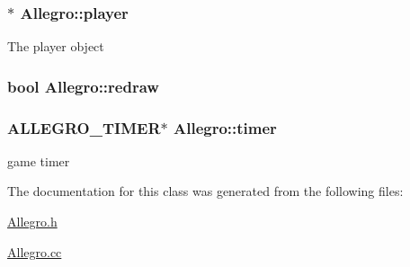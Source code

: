 \label{classAllegro_ae15c8aa4996c4a2063f5678630eb9e65}
\hypertarget{classAllegro_a888f6af0c64c1c1eac49fc54d283e035}{
\subsubsection[{player}]{$\ast$ {\bf Allegro::player}}}
\label{classAllegro_a888f6af0c64c1c1eac49fc54d283e035}
The player object \hypertarget{classAllegro_a09c325f5ec95db410ce99ea5c4312b4b}{
\subsubsection[{redraw}]{\setlength{\rightskip}{0pt plus 5cm}bool {\bf Allegro::redraw}}}
\label{classAllegro_a09c325f5ec95db410ce99ea5c4312b4b}
\hypertarget{classAllegro_a34a3f6946a82531b3cd7855bf96dfec5}{
\subsubsection[{timer}]{\setlength{\rightskip}{0pt plus 5cm}ALLEGRO\_\-TIMER$\ast$ {\bf Allegro::timer}}}
\label{classAllegro_a34a3f6946a82531b3cd7855bf96dfec5}
game timer 

The documentation for this class was generated from the following files:\begin{DoxyCompactItemize}
\item 
\hyperlink{Allegro_8h}{Allegro.h}\item 
\hyperlink{Allegro_8cc}{Allegro.cc}\end{DoxyCompactItemize}
